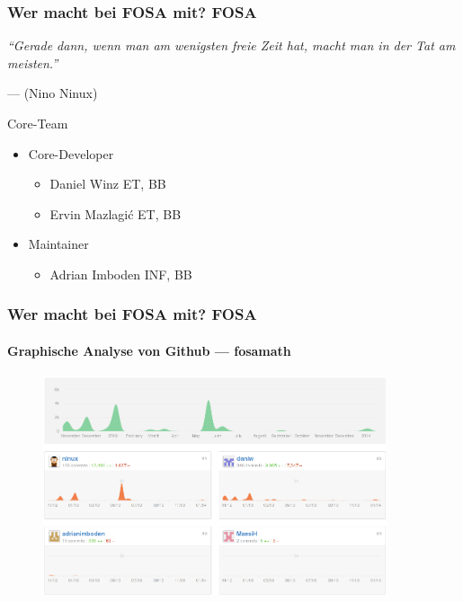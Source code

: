 \begin{frame}
	\frametitle{Wer macht bei FOSA mit? \hfill{} \footnotesize{FOSA}}
	\textit{"`Gerade dann, wenn man am wenigsten freie Zeit hat, 
	macht man in der Tat am meisten."'}

	\hfill{} --- (Nino Ninux)
	\vfill{}
	\begin{block}{Core-Team}
		\begin{itemize}
			\item Core-Developer
				\begin{itemize}
					\item Daniel Winz 
						\hfill{} \footnotesize
						ET, BB \normalsize
					\item Ervin Mazlagi\'c
						\hfill{} \footnotesize
						ET, BB \normalsize
				\end{itemize}
			\item Maintainer
				\begin{itemize}
					\item Adrian Imboden
						\hfill{} \footnotesize
						INF, BB \normalsize
				\end{itemize}
		\end{itemize}
	\end{block}
\end{frame}

\begin{frame}
	\frametitle{Wer macht bei FOSA mit? \hfill{} \footnotesize{FOSA}}
	\framesubtitle{Graphische Analyse von Github --- fosamath}
	\begin{figure}
		\centering
		\includegraphics[width=0.9\textwidth]{fig/fosamath-additions.png}
	\end{figure}
\end{frame}

